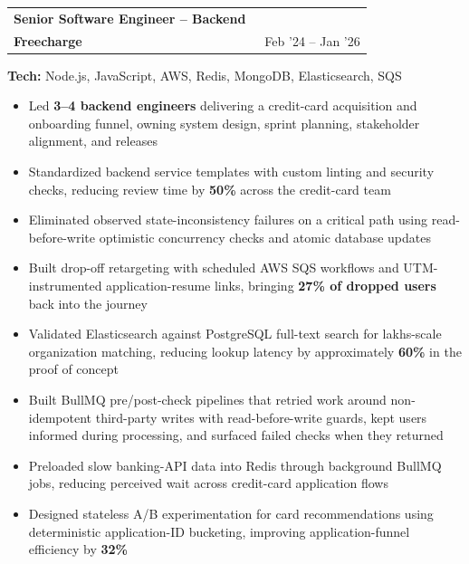 \documentclass[a4paper,11pt]{article}
\makeatletter
\newcommand{\resumeSubheading}[4]{
  \item
    \begin{tabular*}{0.97\textwidth}{l@{\extracolsep{\fill}}r}
      \textbf{#1} & #2 \\
      {#3} & {#4} \\
    \end{tabular*}
}
\makeatother
\begin{document}
  \resumeSubheading
    {Senior Software Engineer -- Backend}{}
    {\textbf{Freecharge}}{\faCalendar\ Feb '24 -- Jan '26}
    {\small\textbf{Tech:} Node.js, JavaScript, AWS, Redis, MongoDB, Elasticsearch, SQS\par}
    \begin{itemize}
      \item{Led \textbf{3--4 backend engineers} delivering a credit-card acquisition and onboarding funnel, owning system design, sprint planning, stakeholder alignment, and releases}
      \vspace{-2pt}
      \item{Standardized backend service templates with custom linting and security checks, reducing review time by \textbf{50\%} across the credit-card team}
      \vspace{-2pt}
      \item{Eliminated observed state-inconsistency failures on a critical path using read-before-write optimistic concurrency checks and atomic database updates}
      \vspace{-2pt}
      \item{Built drop-off retargeting with scheduled AWS SQS workflows and UTM-instrumented application-resume links, bringing \textbf{27\% of dropped users} back into the journey}
      \vspace{-2pt}
      \item{Validated Elasticsearch against PostgreSQL full-text search for lakhs-scale organization matching, reducing lookup latency by approximately \textbf{60\%} in the proof of concept}
      \vspace{-2pt}
      \item{Built BullMQ pre/post-check pipelines that retried work around non-idempotent third-party writes with read-before-write guards, kept users informed during processing, and surfaced failed checks when they returned}
      \vspace{-2pt}
      \item{Preloaded slow banking-API data into Redis through background BullMQ jobs, reducing perceived wait across credit-card application flows}
      \vspace{-2pt}
      \item{Designed stateless A/B experimentation for card recommendations using deterministic application-ID bucketing, improving application-funnel efficiency by \textbf{32\%}}
    \end{itemize}
    \vspace{-4pt}
\end{document}
